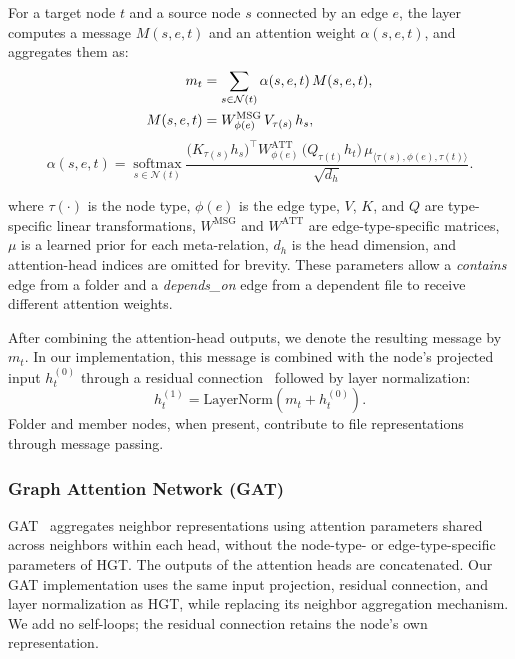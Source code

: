 For a target node $t$ and a source node $s$ connected by an edge $e$, the layer computes a message $M(s,e,t)$ and an attention weight $\alpha(s,e,t)$, and aggregates them as:
\begin{align}
m_t &= \sum_{s \in \mathcal{N}(t)}
       \alpha(s,e,t)\, M(s,e,t), \\
M(s,e,t) &= W^{\mathrm{MSG}}_{\phi(e)}\,
            V_{\tau(s)}\, h_s, \notag
\end{align}
\begingroup
\fontsize{9.5pt}{12pt}\selectfont
\begin{equation*}
\alpha(s,e,t)
= \operatorname*{softmax}_{s \in \mathcal{N}(t)}
\frac{
  \big(K_{\tau(s)} h_s\big)^{\top}
  W^{\mathrm{ATT}}_{\phi(e)}\,
  \big(Q_{\tau(t)} h_t\big)\,
  \mu_{\langle \tau(s),\phi(e),\tau(t)\rangle}
}{\sqrt{d_h}}.
\end{equation*}
\endgroup

\noindent where $\tau(\cdot)$ is the node type, $\phi(e)$ is the edge type, $V$, $K$, and $Q$ are type-specific linear transformations, $W^{\mathrm{MSG}}$ and $W^{\mathrm{ATT}}$ are edge-type-specific matrices, $\mu$ is a learned prior for each meta-relation, $d_h$ is the head dimension, and attention-head indices are omitted for brevity. These parameters allow a \emph{contains} edge from a folder and a \emph{depends\_on} edge from a dependent file to receive different attention weights.

After combining the attention-head outputs, we denote the resulting message by $m_t$. In our implementation, this message is combined with the node's projected input $h_t^{(0)}$ through a residual connection~\cite{residual_connection} followed by layer normalization:
\begin{equation}
h_t^{(1)} = \mathrm{LayerNorm}\left(m_t + h_t^{(0)}\right).
\end{equation}
Folder and member nodes, when present, contribute to file representations through message passing. 
 
\subsubsection{Graph Attention Network (GAT)\label{sec:gat_model}}
GAT~\cite{gat} aggregates neighbor representations using attention parameters shared across neighbors within each head, without the node-type- or edge-type-specific parameters of HGT. The outputs of the attention heads are concatenated. Our GAT implementation uses the same input projection, residual connection, and layer normalization as HGT, while replacing its neighbor aggregation mechanism. We add no self-loops; the residual connection retains the node's own representation.
 
